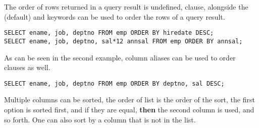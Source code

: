 \documentclass[11pt,a4paper,twocolumn]{book}
\begin{document}
The order of rows returned in a query result is undefined,  clause, alongside the  (default) and  keywords can be used to order the rows of a query result.

\begin{lstlisting}
SELECT ename, job, deptno FROM emp ORDER BY hiredate DESC;
SELECT ename, job, deptno, sal*12 annsal FROM emp ORDER BY annsal;
\end{lstlisting}

As can be seen in the second example, column aliases can be used to order clauses as well.\\

\begin{lstlisting}
SELECT ename, job, deptno FROM emp ORDER BY deptno, sal DESC;
\end{lstlisting}

Multiple columns can be sorted, the order of  list is the order of the sort, the first option is sorted first, and if they are equal, \textbf{then} the second column is used, and so forth. One can also sort by a column that is not in the  list.
\end{document}
